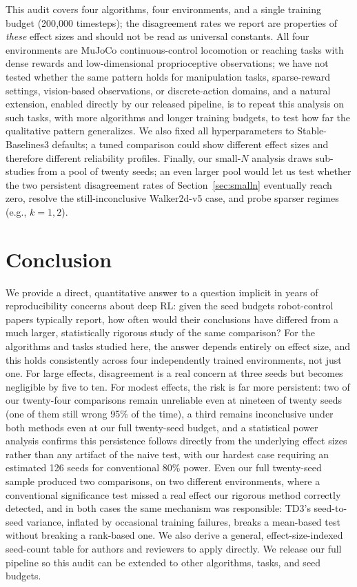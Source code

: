 \documentclass[journal]{IEEEtran}
\begin{document}
This audit covers four algorithms, four environments, and a single training budget (200{,}000
timesteps); the disagreement rates we report are properties of \emph{these} effect sizes and
should not be read as universal constants. All four environments are MuJoCo continuous-control
locomotion or reaching tasks with dense rewards and low-dimensional proprioceptive observations; we
have not tested whether the same pattern holds for manipulation tasks, sparse-reward settings,
vision-based observations, or discrete-action domains, and a natural extension, enabled directly by
our released pipeline, is to repeat this analysis on such tasks, with more algorithms and longer
training budgets, to test how far the qualitative pattern generalizes. We also fixed all
hyperparameters to Stable-Baselines3 defaults; a tuned comparison could show different effect sizes
and therefore different reliability profiles. Finally, our small-$N$ analysis draws sub-studies
from a pool of twenty seeds; an even larger pool would let us test whether the two persistent
disagreement rates of Section~\ref{sec:smalln} eventually reach zero, resolve the still-inconclusive
Walker2d-v5 case, and probe sparser regimes (e.g., $k=1,2$).

\section{Conclusion}

We provide a direct, quantitative answer to a question implicit in years of reproducibility
concerns about deep RL: given the seed budgets robot-control papers typically report, how often
would their conclusions have differed from a much larger, statistically rigorous study of the same
comparison? For the algorithms and tasks studied here, the answer depends entirely on effect size,
and this holds consistently across four independently trained environments, not just one. For
large effects, disagreement is a real concern at three seeds but becomes negligible by five to ten.
For modest effects, the risk is far more persistent: two of our twenty-four comparisons remain
unreliable even at nineteen of twenty seeds (one of them still wrong 95\% of the time), a third
remains inconclusive under both methods even at our full twenty-seed budget, and a statistical
power analysis confirms this persistence follows directly from the underlying effect sizes rather
than any artifact of the naive test, with our hardest case requiring an estimated 126 seeds for
conventional 80\% power. Even our full twenty-seed sample produced two comparisons, on two
different environments, where a conventional significance test missed a real effect our rigorous
method correctly detected, and in both cases the same mechanism was responsible: TD3's
seed-to-seed variance, inflated by occasional training failures, breaks a mean-based test without
breaking a rank-based one. We also derive a general, effect-size-indexed seed-count table for
authors and reviewers to apply directly. We release our full pipeline so this audit can be
extended to other algorithms, tasks, and seed budgets.
\end{document}
